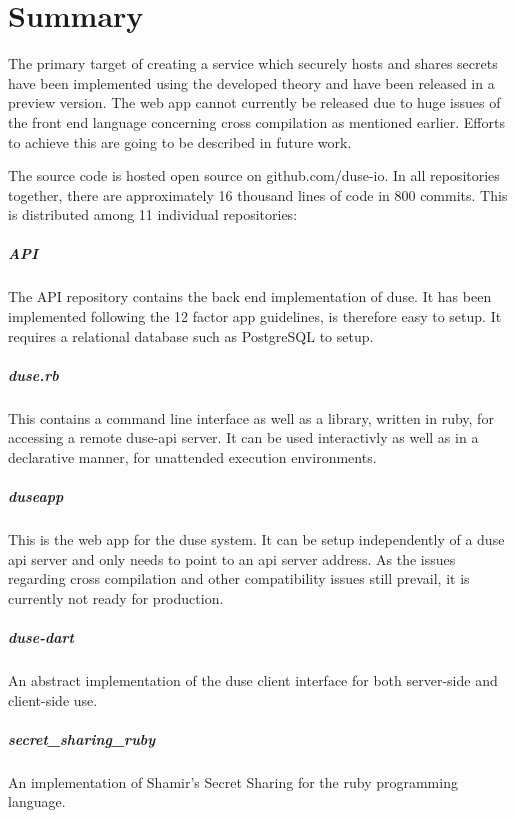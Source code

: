 \chapter{Summary}

The primary target of creating a service which securely hosts and shares
secrets have been implemented using the developed theory and have been released
in a preview version. The web app cannot currently be released due to huge
issues of the front end language concerning cross compilation as mentioned
earlier. Efforts to achieve this are going to be described in future work.

The source code is hosted open source on github.com/duse-io.  In all
repositories together, there are approximately 16 thousand lines of code in 800
commits. This is distributed among 11 individual repositories:

\paragraph{API} The API repository contains the back end implementation of
duse. It has been implemented following the 12 factor app guidelines, is
therefore easy to setup. It requires a relational database such as PostgreSQL
to setup.

\paragraph{duse.rb} This contains a command line interface as well as a
library, written in ruby, for accessing a remote duse-api server. It can be
used interactivly as well as in a declarative manner, for unattended execution
environments.

\paragraph{duseapp} This is the web app for the duse system. It can be
setup independently of a duse api server and only needs to point to an
api server address. As the issues regarding cross compilation and other
compatibility issues still prevail, it is currently not ready for production.

\paragraph{duse-dart} An abstract implementation of the duse client interface
for both server-side and client-side use.

\paragraph{secret\_sharing\_ruby} An implementation of Shamir's Secret Sharing
for the ruby programming language.

